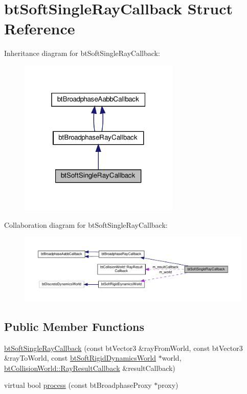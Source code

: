 \hypertarget{structbtSoftSingleRayCallback}{}\section{bt\+Soft\+Single\+Ray\+Callback Struct Reference}
\label{structbtSoftSingleRayCallback}


Inheritance diagram for bt\+Soft\+Single\+Ray\+Callback\+:
\nopagebreak
\begin{figure}[H]
\begin{center}
\leavevmode
\includegraphics[width=217pt]{structbtSoftSingleRayCallback__inherit__graph}
\end{center}
\end{figure}


Collaboration diagram for bt\+Soft\+Single\+Ray\+Callback\+:
\nopagebreak
\begin{figure}[H]
\begin{center}
\leavevmode
\includegraphics[width=350pt]{structbtSoftSingleRayCallback__coll__graph}
\end{center}
\end{figure}
\subsection*{Public Member Functions}
\begin{DoxyCompactItemize}
\item 
\hyperlink{structbtSoftSingleRayCallback_ae3a700f866158df32a38877dc08eac9f}{bt\+Soft\+Single\+Ray\+Callback} (const bt\+Vector3 \&ray\+From\+World, const bt\+Vector3 \&ray\+To\+World, const \hyperlink{classbtSoftRigidDynamicsWorld}{bt\+Soft\+Rigid\+Dynamics\+World} $\ast$world, \hyperlink{structbtCollisionWorld_1_1RayResultCallback}{bt\+Collision\+World\+::\+Ray\+Result\+Callback} \&result\+Callback)
\item 
virtual bool \hyperlink{structbtSoftSingleRayCallback_a9625cb3d48cfe194f1af2b52c4cf90cd}{process} (const bt\+Broadphase\+Proxy $\ast$proxy)
\end{DoxyCompactItemize}
